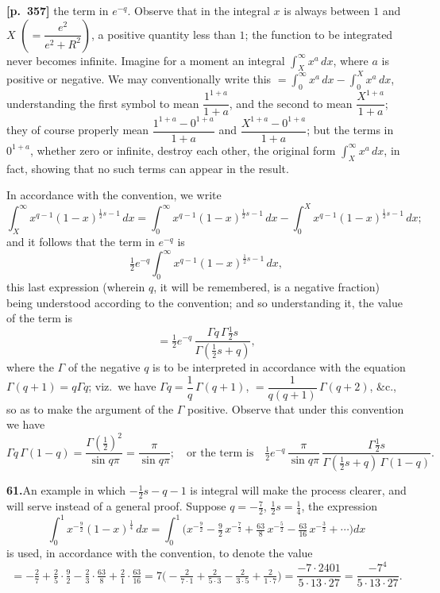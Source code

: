\documentclass[11pt]{article}
\begin{document}
\bigskip

\noindent\textbf{[p.~357]}\quad
the term in $e^{-q}$. Observe that in the integral $x$ is always between $1$ and $X$ $\left(=\dfrac{e^{2}}{e^{2}+R^{2}}\right)$, a positive quantity less than $1$; the function to be integrated never becomes infinite. Imagine for a moment an integral $\displaystyle\int_{X}^{\infty} x^{a}\,dx$, where $a$ is positive or negative. We may conventionally write this $= \displaystyle\int_{0}^{\infty} x^{a}\,dx - \int_{0}^{X} x^{a}\,dx$, understanding the first symbol to mean $\dfrac{1^{1+a}}{1+a}$, and the second to mean $\dfrac{X^{1+a}}{1+a}$; they of course properly mean $\dfrac{1^{1+a} - 0^{1+a}}{1+a}$ and $\dfrac{X^{1+a} - 0^{1+a}}{1+a}$; but the terms in $0^{1+a}$, whether zero or infinite, destroy each other, the original form $\displaystyle\int_{X}^{\infty} x^{a}\,dx$, in fact, showing that no such terms can appear in the result.

In accordance with the convention, we write
\[
\int_{X}^{\infty} x^{q-1}(1-x)^{\frac{1}{2}s-1}\,dx
= \int_{0}^{\infty} x^{q-1}(1-x)^{\frac{1}{2}s-1}\,dx - \int_{0}^{X} x^{q-1}(1-x)^{\frac{1}{2}s-1}\,dx;
\]
and it follows that the term in $e^{-q}$ is
\[
\tfrac{1}{2}e^{-q}\int_{0}^{\infty} x^{q-1}(1-x)^{\frac{1}{2}s-1}\,dx,
\]
this last expression (wherein $q$, it will be remembered, is a negative fraction) being understood according to the convention; and so understanding it, the value of the term is
\[
= \tfrac{1}{2}e^{-q}\,\frac{\Gamma q\,\Gamma\tfrac{1}{2}s}{\Gamma(\tfrac{1}{2}s+q)},
\]
where the $\Gamma$ of the negative $q$ is to be interpreted in accordance with the equation
$\Gamma(q+1)=q\Gamma q$; viz.\ we have $\Gamma q = \dfrac{1}{q}\,\Gamma(q+1)$, $= \dfrac{1}{q(q+1)}\,\Gamma(q+2)$, \&c., so as to make the argument of the $\Gamma$ positive. Observe that under this convention we have
\[
\Gamma q\,\Gamma(1-q) = \frac{\Gamma(\tfrac{1}{2})^{2}}{\sin q\pi} = \frac{\pi}{\sin q\pi};
\quad\text{or the term is}\quad
\tfrac{1}{2}e^{-q}\,\frac{\pi}{\sin q\pi}\,\frac{\Gamma\tfrac{1}{2}s}{\Gamma(\tfrac{1}{2}s+q)\,\Gamma(1-q)}.
\]

\bigskip

\noindent\textbf{61.}\quad An example in which $-\tfrac{1}{2}s-q-1$ is integral will make the process clearer, and will serve instead of a general proof. Suppose $q=-\tfrac{7}{2}$, $\tfrac{1}{2}s=\tfrac{1}{4}$, the expression
\[
\int_{0}^{1} x^{-\frac{9}{2}}(1-x)^{\frac{1}{4}}\,dx
= \int_{0}^{1}\bigl(x^{-\frac{9}{2}} - \tfrac{9}{2}\,x^{-\frac{7}{2}} + \tfrac{63}{8}\,x^{-\frac{5}{2}} - \tfrac{63}{16}\,x^{-\frac{3}{2}} + \cdots\bigr)dx
\]
is used, in accordance with the convention, to denote the value
\[
= -\tfrac{2}{7} + \tfrac{2}{5}\cdot\tfrac{9}{2} - \tfrac{2}{3}\cdot\tfrac{63}{8} + \tfrac{2}{1}\cdot\tfrac{63}{16}
= 7\bigl(-\tfrac{2}{7\cdot 1} + \tfrac{2}{5\cdot 3} - \tfrac{2}{3\cdot 5} + \tfrac{2}{1\cdot 7}\bigr)
= \frac{-7\cdot 2401}{5\cdot 13\cdot 27} = \frac{-7^{4}}{5\cdot 13\cdot 27}.
\]
\end{document}
